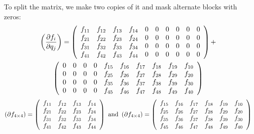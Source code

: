 \documentclass[12pt]{article}
\begin{document}
To split the matrix, we make two copies of it and mask alternate
blocks with zeros:
\begin{multline}
\left(\frac{\partial f_i}{\partial q_j}\right) =
\left(\begin{array}{c c c c c c c c c c}
f_{11} & f_{12} & f_{13} & f_{14} & 0 & 0 & 0 & 0 & 0 & 0 \\
f_{21} & f_{22} & f_{23} & f_{24} & 0 & 0 & 0 & 0 & 0 & 0 \\
f_{31} & f_{32} & f_{33} & f_{34} & 0 & 0 & 0 & 0 & 0 & 0 \\
f_{41} & f_{42} & f_{43} & f_{44} & 0 & 0 & 0 & 0 & 0 & 0 \\
\end{array}\right) + \\
\left(\begin{array}{c c c c c c c c c c}
0 & 0 & 0 & 0 & f_{15} & f_{16} & f_{17} & f_{18} & f_{19} & f_{10} \\
0 & 0 & 0 & 0 & f_{25} & f_{26} & f_{27} & f_{28} & f_{29} & f_{20} \\
0 & 0 & 0 & 0 & f_{35} & f_{36} & f_{37} & f_{38} & f_{39} & f_{30} \\
0 & 0 & 0 & 0 & f_{45} & f_{46} & f_{47} & f_{48} & f_{49} & f_{40} \\
\end{array}\right)
\end{multline}
\begin{equation}
\left(\partial f_{4\times 4}\right) = \left(\begin{array}{c c c c}
f_{11} & f_{12} & f_{13} & f_{14} \\
f_{21} & f_{22} & f_{23} & f_{24} \\
f_{31} & f_{32} & f_{33} & f_{34} \\
f_{41} & f_{42} & f_{43} & f_{44} \\
\end{array}\right) \mbox{ and }
\left(\partial f_{4\times 4}\right) = \left(\begin{array}{c c c c c c}
f_{15} & f_{16} & f_{17} & f_{18} & f_{19} & f_{10} \\
f_{25} & f_{26} & f_{27} & f_{28} & f_{29} & f_{20} \\
f_{35} & f_{36} & f_{37} & f_{38} & f_{39} & f_{30} \\
f_{45} & f_{46} & f_{47} & f_{48} & f_{49} & f_{40} \\
\end{array}\right)
\vspace{0.25 cm}
\end{equation}
\end{document}

